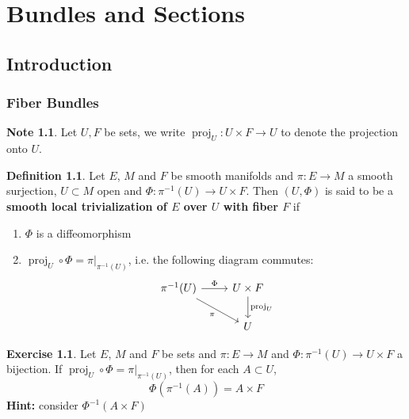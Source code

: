 \documentclass{book}
\theoremstyle{definition}
\newtheorem{defn}[definition]{Definition}
\newtheorem{note}[definition]{Note}
\newtheorem{ex}[definition]{Exercise}
\DeclareMathOperator{\prj}{\text{proj}}
\DeclareMathOperator*{\0}{\mbf{0}}
\DeclareMathOperator*{\1}{\mbf{1}}
\newcommand{\tbf}[1]{\textbf{#1}}
\begin{document}
	
	
	
	
	
	
	
	

	
	\newpage
	\chapter{Bundles and Sections}
	
	\section{Introduction}
	
	\subsection{Fiber Bundles}
	
	\begin{note}
		Let $U, F$ be sets, we write $\prj_U: U \times F \rightarrow U$ to denote the projection onto $U$.
	\end{note}
	
	\begin{defn}
		Let $E$, $M$ and $F$ be smooth manifolds and $\pi: E \rightarrow M$ a smooth surjection, $U \subset M$ open and $\Phi: \pi^{-1}(U) \rightarrow U \times F$. Then $(U, \Phi)$ is said to be a \tbf{smooth local trivialization of $E$ over $U$ with fiber $F$}  if 
		\begin{enumerate}
			\item $\Phi$ is a diffeomorphism
			\item $\prj_U \circ \Phi = \pi|_{\pi^{-1}(U)}$, i.e. the following diagram commutes:
			\[ 
			\begin{tikzcd}
			\pi^{-1}(U) \arrow[r, "\Phi"] \arrow[dr, "\pi"'] & U \times F \arrow[d, "\prj_U"]  \\
			& U
			\end{tikzcd}
			\]
		\end{enumerate}
	\end{defn}

	\begin{ex}
		Let $E$, $M$ and $F$ be sets and $\pi: E \rightarrow M$ and $\Phi: \pi^{-1}(U) \rightarrow U \times F$ a bijection. If $\prj_U \circ \Phi = \pi|_{\pi^{-1}(U)}$, then for each $A \subset U$, $$\Phi( \pi^{-1}(A)) = A \times F$$
		\tbf{Hint:} consider $\Phi^{-1}(A \times F)$ 
	\end{ex}
	
\end{document}

